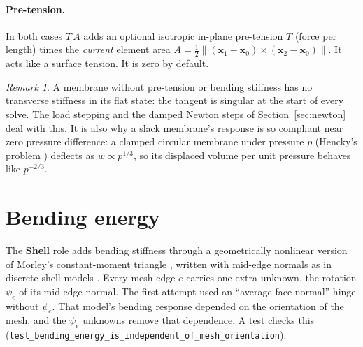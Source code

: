 \documentclass[11pt,a4paper]{article}
\newcommand{\vect}[1]{\bm{#1}}
\newcommand{\x}{\vect{x}}
\newcommand{\code}[1]{\texttt{#1}}
\theoremstyle{remark}
\newtheorem*{remark}{Remark}
\begin{document}
\paragraph{Pre-tension.} In both cases $T\,A$ adds an optional isotropic in-plane pre-tension $T$
(force per length) times the \emph{current} element area
$A = \tfrac12\|(\x_1-\x_0)\times(\x_2-\x_0)\|$. It acts like a surface tension. It is zero by
default.

\begin{remark}
A membrane without pre-tension or bending stiffness has no transverse stiffness in its flat
state: the tangent is singular at the start of every solve. The load stepping and the damped
Newton steps of Section~\ref{sec:newton} deal with this. It is also why a slack membrane's response
is so compliant near zero pressure difference: a clamped circular membrane under pressure $p$
(Hencky's problem \cite{hencky1915}) deflects as $w \propto p^{1/3}$, so its displaced volume per
unit pressure behaves like $p^{-2/3}$.
\end{remark}

\section{Bending energy}\label{sec:bending}

The \textbf{Shell} role adds bending stiffness through a geometrically nonlinear version of
Morley's constant-moment triangle \cite{morley1971}, written with mid-edge normals as in discrete
shell models \cite{grinspun2003,grinspun2006}. Every mesh edge $e$ carries one extra unknown, the
rotation $\psi_e$ of its mid-edge normal. The first attempt used an ``average face normal'' hinge
without $\psi_e$. That model's bending response depended on the orientation of the mesh, and the
$\psi_e$ unknowns remove that dependence. A test checks this
(\code{test\_bending\_energy\_is\_independent\_of\_mesh\_orientation}).
\end{document}
